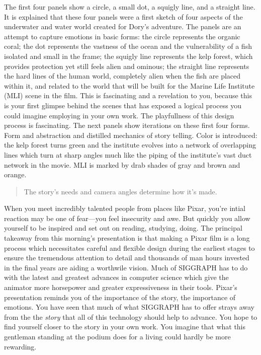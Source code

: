 \documentclass[../main.tex]{subfiles}
\begin{document}
The first four panels show a circle, a small dot, a squigly line, and a straight line. It is explained that these four panels were a first sketch of four aspects of the underwater and water world created for Dory's adventure. The panels are an attempt to capture emotions in basic forms: the circle represents the organic coral; the dot represents the vastness of the ocean and the vulnerability of a fish isolated and small in the frame; the squigly line represents the kelp forest, which provides protection yet still feels alien and ominous; the straight line represents the hard lines of the human world, completely alien when the fish are placed within it, and related to the world that will be built for the Marine Life Institute (MLI) scene in the film. This is fascinating and a revelation to you, because this is your first glimpse behind the scenes that has exposed a logical process you could imagine employing in your own work. The playfullness of this design process is fascinating. The next panels show iterations on these first four forms. Form and abstraction and distilled mechanics of story telling. Color is introduced: the kelp forest turns green and the institute evolves into a network of overlapping lines which turn at sharp angles much like the piping of the institute's vast duct network in the movie. MLI is marked by drab shades of gray and brown and orange.

\begin{quotation}
The story's needs and camera angles determine how it's made.
\end{quotation}

When you meet incredibly talented people from places like Pixar, you're intial reaction may be one of fear---you feel insecurity and awe. But quickly you allow yourself to be inspired and set out on reading, studying, doing. The principal takeaway from this morning's presentation is that making a Pixar film is a long process which necessitates careful and flexible design during the earliest stages to ensure the tremendous attention to detail and thousands of man hours invested in the final years are aiding a worthwile vision. Much of SIGGRAPH has to do with the latest and greatest advances in computer science which give the animator more horsepower and greater expressiveness in their tools. Pixar's presentation reminds you of the importance of the story, the importance of emotions. You have seen that much of what SIGGRAPH has to offer strays away from the the \textit{story} that all of this technology should help to advance. You hope to find yourself closer to the story in your own work. You imagine that what this gentleman standing at the podium does for a living could hardly be more rewarding.
\end{document}
